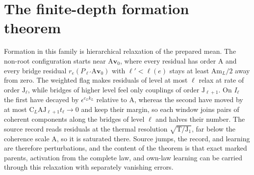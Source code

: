 \section{The finite-depth formation theorem}
\label{sec:rg-formation-theorem}
\label{sec:rg-formation-common-regime-proof}

Formation in this family is hierarchical relaxation of the prepared mean. The
non-root configuration starts near \(\mathrm A\mathbf v_0\), where every
residual has order \(\mathrm A\) and every bridge residual
\(r_e(P_{\ell'}\mathrm A\mathbf v_0)\) with \(\ell'<\ell(e)\) stays at least
\(\mathrm A\mathrm m_L/2\) away from zero. The weighted flag makes residuals
of level at most \(\ell\) relax at rate of order \(\mathrm J_\ell\), while
bridges of higher level feel only couplings of order \(\mathrm J_{\ell+1}\).
On \(I_\ell\) the first have decayed by \(\epsilon^{\mathrm c_Lk_L}\) relative
to \(\mathrm A\), whereas the second have moved by at most
\(\mathrm C_L\mathrm A\mathrm J_{\ell+1}t_\ell\to0\) and keep their margin, so
each window joins pairs of coherent components along the bridges of level
\(\ell\) and halves their number. The source record reads residuals at the
thermal resolution \(\sqrt{\mathrm T/\mathrm J_1}\), far below
the coherence scale \(\mathrm A\), so it is saturated there. Source jumps, the
record, and learning are therefore perturbations, and the content of the
theorem is that exact marked parents, activation from the complete law, and
own-law learning can be carried through this relaxation with separately
vanishing errors.

